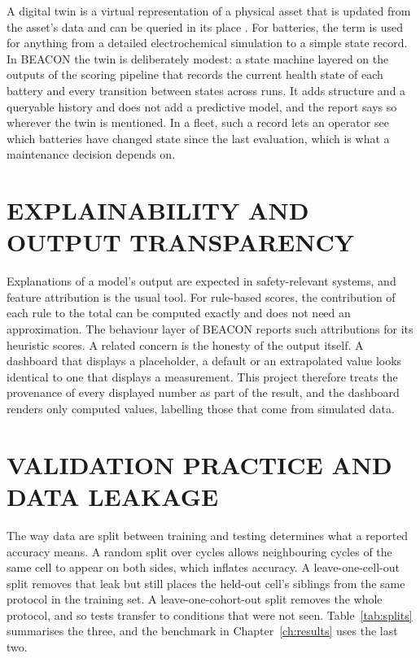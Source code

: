 A digital twin is a virtual representation of a physical asset that is updated from the asset's data and can be queried in its place \cite{grieves2014}. For batteries, the term is used for anything from a detailed electrochemical simulation to a simple state record. In BEACON the twin is deliberately modest: a state machine layered on the outputs of the scoring pipeline that records the current health state of each battery and every transition between states across runs. It adds structure and a queryable history and does not add a predictive model, and the report says so wherever the twin is mentioned. In a fleet, such a record lets an operator see which batteries have changed state since the last evaluation, which is what a maintenance decision depends on.

\section{EXPLAINABILITY AND OUTPUT TRANSPARENCY}

Explanations of a model's output are expected in safety-relevant systems, and feature attribution is the usual tool. For rule-based scores, the contribution of each rule to the total can be computed exactly and does not need an approximation. The behaviour layer of BEACON reports such attributions for its heuristic scores. A related concern is the honesty of the output itself. A dashboard that displays a placeholder, a default or an extrapolated value looks identical to one that displays a measurement. This project therefore treats the provenance of every displayed number as part of the result, and the dashboard renders only computed values, labelling those that come from simulated data.

\section{VALIDATION PRACTICE AND DATA LEAKAGE}

The way data are split between training and testing determines what a reported accuracy means. A random split over cycles allows neighbouring cycles of the same cell to appear on both sides, which inflates accuracy. A leave-one-cell-out split removes that leak but still places the held-out cell's siblings from the same protocol in the training set. A leave-one-cohort-out split removes the whole protocol, and so tests transfer to conditions that were not seen. Table~\ref{tab:splits} summarises the three, and the benchmark in Chapter~\ref{ch:results} uses the last two.

